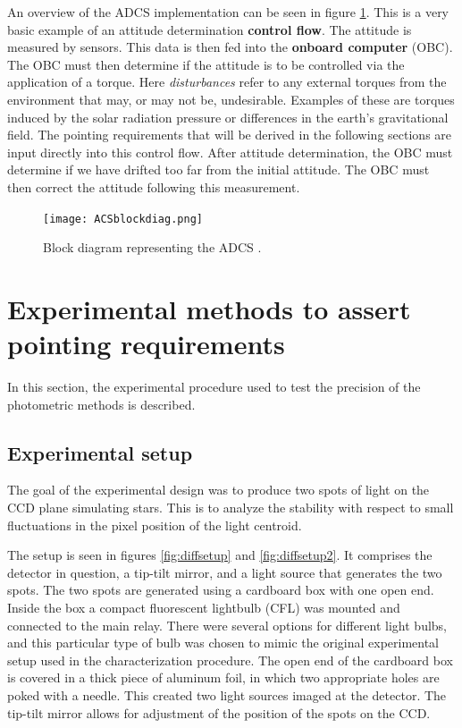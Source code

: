 \documentclass[../main.tex]{subfiles}
\begin{document}
An overview of the ADCS implementation can be seen in figure \ref{fig:acsblockdiag}. This is a very basic example of an attitude determination \textbf{control flow}. The attitude is measured by sensors. This data is then fed into the \textbf{onboard computer} (OBC). The OBC must then determine if the attitude is to be controlled via the application of a torque. Here \textit{disturbances} refer to any external torques from the environment that may, or may not be, undesirable. Examples of these are torques induced by the solar radiation pressure or differences in the earth's gravitational field. The pointing requirements that will be derived in the following sections are input directly into this control flow. After attitude determination, the OBC must determine if we have drifted too far from the initial attitude. The OBC must then correct the attitude following this measurement. 

\begin{figure}[h!]
	\centering
	\texttt{[image: ACSblockdiag.png]}
	\caption{Block diagram representing the ADCS \cite{SSE}.}
	\label{fig:acsblockdiag}
\end{figure}
\clearpage
\section{Experimental methods to assert pointing requirements}
In this section, the experimental procedure used to test the precision of the photometric methods is described. 

\subsection{Experimental setup}\label{sect:diffsetup}
The goal of the experimental design was to produce two spots of light on the CCD plane simulating stars. This is to analyze the stability with respect to small fluctuations in the pixel position of the light centroid. 

The setup is seen in figures \ref{fig:diffsetup} and \ref{fig:diffsetup2}. It comprises the detector in question, a tip-tilt mirror, and a light source that generates the two spots. The two spots are generated using a cardboard box with one open end. Inside the box a compact fluorescent lightbulb (CFL) was mounted and connected to the main relay. There were several options for different light bulbs, and this particular type of bulb was chosen to mimic the original experimental setup used in the characterization procedure. The open end of the cardboard box is covered in a thick piece of aluminum foil, in which two appropriate holes are poked with a needle. This created two light sources imaged at the detector. The tip-tilt mirror allows for adjustment of the position of the spots on the CCD. 
\end{document}
